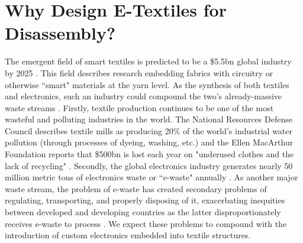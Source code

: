 
\section{Why Design E-Textiles for Disassembly?}

The emergent field of smart textiles is predicted to be a \$5.5bn global industry by 2025 \cite{research_global_2019}. This field describes research embedding fabrics with circuitry or otherwise ``smart" materials at the yarn level. As the synthesis of both textiles and electronics, such an industry could compound the two's already-massive waste streams \cite{noauthor_smart_2012, circular_fashion, WEARSustain}. Firstly, textile production continues to be one of the most wasteful and polluting industries in the world. The National Resources Defense Council describes textile mills as producing 20\% of the world's industrial water pollution (through processes of dyeing, washing, etc.) \cite{noauthor_encourage_nodate} and the Ellen MacArthur Foundation reports that \$500bn is lost each year on "underused clothes and the lack of recycling" \cite{circular_fashion}. Secondly, the global electronics industry generates nearly 50 million metric tons of electronics waste or ``e-waste" annually \cite{rifat_breaking_2019}. As another major waste stream, the problem of e-waste has created secondary problems of regulating, transporting, and properly disposing of it, exacerbating inequities between developed and developing countries as the latter disproportionately receives e-waste to process \cite{Zhang:2011:DAU:2347504.2347511, raghavan_means_2017}. We expect these problems to compound with the introduction of custom electronics embedded into textile structures.

